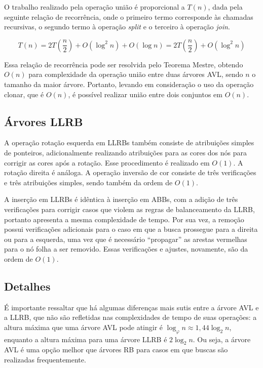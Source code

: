 \documentclass[a4paper,12pt]{report}
\begin{document}
O trabalho realizado pela operação união é proporcional a $T(n)$, dada pela seguinte 
relação de recorrência, onde o primeiro termo corresponde às chamadas recursivas,
o segundo termo à operação \textit{split} e o terceiro à operação \textit{join}.

\[
            T(n) = 2T\left(\frac{n}{2}\right) + O(\log^2 n) + O(\log n) 
                 = 2T\left(\frac{n}{2}\right) + O(\log^2 n)
\]

Essa relação de recorrência pode ser resolvida pelo Teorema Mestre, obtendo $O(n)$ para
complexidade da operação união entre duas árvores AVL, sendo $n$ o tamanho da maior árvore.
Portanto, levando em consideração o uso da operação clonar, que é $O(n)$, é possível 
realizar união entre dois conjuntos em $O(n)$.

\subsection*{Árvores LLRB}

A operação rotação esquerda em LLRBs também consiste de atribuições simples de ponteiros,
adicionalmente realizando atribuições para as cores dos nós para corrigir as cores após a
rotação. Esse procedimento é realizado em $O(1)$. A rotação direita é análoga. A operação
inversão de cor consiste de três verificações e três atribuições simples, sendo também da
ordem de $O(1)$.

A inserção em LLRBs é idêntica à inserção em ABBs, com a adição de três verificações
para corrigir casos que violem as regras de balanceamento da LLRB, portanto apresenta
a mesma complexidade de tempo. Por sua vez, a remoção possui verificações adicionais 
para o caso em que a busca prossegue para a direita ou para a esquerda, uma vez que é
necessário ``propagar'' as arestas vermelhas para o nó folha a ser removido. Essas 
verificações e ajustes, novamente, são da ordem de $O(1)$.

\subsection*{Detalhes}

É importante ressaltar que há algumas diferenças mais sutis entre a árvore AVL e a LLRB,
que não são refletidas nas complexidades de tempo de suas operações: a altura máxima que
uma árvore AVL pode atingir é $\log_{\varphi} n \approx 1{,}44 \log_2 n$, enquanto 
a altura máxima para uma árvore LLRB é $2 \log_2 n$. Ou seja, a árvore AVL é uma 
opção melhor que árvores RB para casos em que buscas são realizadas frequentemente.

\printbibliography
\end{document}
